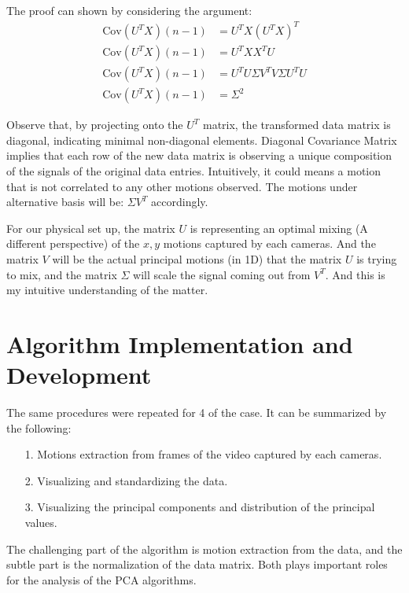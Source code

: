 \documentclass{article}
\begin{document}
        \par
        The proof can shown by considering the argument: 
        \begin{align*}\tag{4}\label{eqn:4}
            \text{Cov}(U^TX)(n - 1) &= U^TX(U^TX)^T 
            \\
            \text{Cov}(U^TX)(n - 1) &= U^TXX^TU
            \\
            \text{Cov}(U^TX)(n - 1) &= U^TU\Sigma V^TV \Sigma U^TU
            \\
            \text{Cov}(U^TX)(n - 1) &= \Sigma^2
        \end{align*}
        \par
        Observe that, by projecting onto the $U^T$ matrix, the transformed data matrix is diagonal, indicating minimal non-diagonal elements. Diagonal Covariance Matrix implies that each row of the new data matrix is observing a unique composition of the signals of the original data entries. Intuitively, it could means a motion that is not correlated to any other motions observed. The motions under alternative basis will be: $\Sigma V^T$ accordingly. 
        \par
        For our physical set up, the matrix $U$ is representing an optimal mixing (A different perspective) of the $x, y$ motions captured by each cameras. And the matrix $V$ will be the actual principal motions (in 1D) that the matrix $U$ is trying to mix, and the matrix $\Sigma$ will scale the signal coming out from $V^T$. And this is my intuitive understanding of the matter. 

\section{Algorithm Implementation and Development}
    The same procedures were repeated for 4 of the case. It can be summarized by the following: 
    \begin{enumerate}
    \item[1.] Motions extraction from frames of the video captured by each cameras. 
    \item[2.] Visualizing and standardizing the data. 
    \item[3.] Visualizing the principal components and distribution of the principal values. 
    \end{enumerate}
    \par
    The challenging part of the algorithm is motion extraction from the data, and the subtle part is the normalization of the data matrix. Both plays important roles for the analysis of the PCA algorithms. 
\end{document}
